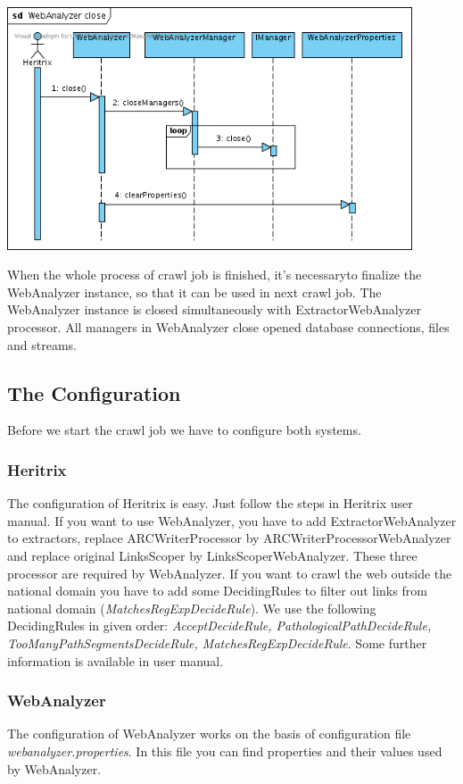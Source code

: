\documentclass[11pt,a4paper]{article}
\begin{document}
\begin{center}
\includegraphics[width=120mm]{SD4.png}
\end{center}

When the whole process of crawl job is finished, it's necessaryto finalize the WebAnalyzer instance, so that it can be used in next crawl job. The WebAnalyzer instance is closed simultaneously with ExtractorWebAnalyzer processor. All managers in WebAnalyzer close opened database connections, files and streams.

\subsection{The Configuration}

Before we start the crawl job we have to configure both systems.

\subsubsection{Heritrix}
The configuration of Heritrix is easy. Just follow the steps in Heritrix user manual. If you want to use WebAnalyzer, you have to add ExtractorWebA\-na\-ly\-zer to extractors, replace ARCWriterProcessor by ARCWriterProcessorWebAnalyzer and replace original LinksScoper by LinksScoperWebAnalyzer. These three processor are required by WebAnalyzer. If you want to crawl the web outside the national domain you have to add some DecidingRules to filter out links from national domain (\emph{MatchesRegExpDecideRule}). We use the following DecidingRules in given order: \emph{AcceptDecideRule, Pa\-tho\-lo\-gi\-calPathDecideRule, TooManyPathSegmentsDecideRule, MatchesRegExpDecideRule}. Some further information is available in user manual.

\subsubsection{WebAnalyzer}
The configuration of WebAnalyzer works on the basis of configuration file \emph{webanalyzer.properties}. In this file you can find properties and their values used by WebAnalyzer.
\end{document}
